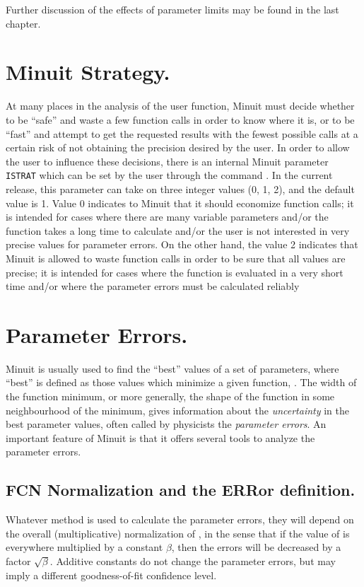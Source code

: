 Further discussion of the effects of parameter limits may be
found in the last chapter.

\section{Minuit Strategy.}

At many places in the analysis of the user function, Minuit must
decide whether to be ``safe'' and waste a few function calls in order
to know where it is, or to be ``fast'' and attempt to get the requested
results with the fewest possible calls at a certain risk of not
obtaining the precision desired by the user.
In order to allow the user to influence these decisions, there is an
internal Minuit parameter \texttt{ISTRAT} which can be set by the user
through the command .  
In the current release,
this parameter can take on three integer values (0, 1, 2), and the
default value is 1.  Value 0 indicates to Minuit that it should
economize function calls; it is intended for cases where there are
many variable parameters and/or the function takes a long time
to calculate and/or the user is not interested in very precise
values for parameter errors.  On the other hand, the value 2 indicates
that Minuit is allowed to waste function calls in order to be sure
that all values are precise; it is intended for cases where the function
is evaluated in a very short time and/or where the parameter errors
must be calculated reliably

\section{Parameter Errors.}

Minuit is usually used to find the ``best'' values of a set of parameters,
where ``best'' is defined as those values which minimize a given function, .
The width of the function minimum, or more generally, the shape of the
function in some neighbourhood of the minimum, gives information about
the {\it uncertainty} in the best parameter values, often called by
physicists the {\it parameter errors}.
An important feature of Minuit is that it offers several tools to analyze
the parameter errors.
\subsection{FCN Normalization and the ERRor definition.}
Whatever method is used to calculate the parameter errors, they will depend
on the overall (multiplicative) normalization of , in the sense that if
the value of  is everywhere multiplied by a constant $\beta$, then the errors
will be decreased by a factor $\sqrt{\beta}$.
Additive constants do not change the parameter
errors, but may imply a different goodness-of-fit confidence level.
 

